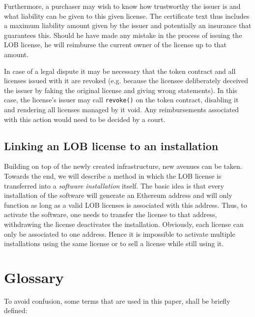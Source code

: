 \documentclass[a4paper]{article}
\begin{document}
Furthermore, a purchaser may wish to know how trustworthy the issuer is and what liability can be given to this given license. The certificate text thus includes a maximum liability amount given by the issuer and potentially an insurance that guarantees this. Should he have made any mistake in the process of issuing the LOB license, he will reimburse the current owner of the license up to that amount.

In case of a legal dispute it may be necessary that the token contract and all licenses issued with it are revoked (e.g. because the licensee deliberately deceived the issuer by faking the original license and giving wrong statements). In this case, the license's issuer may call \texttt{revoke()} on the token contract, disabling it and rendering all licenses managed by it void. Any reimbursements associated with this action would need to be decided by a court.

\subsection{Linking an LOB license to an installation}

Building on top of the newly created infrastructure, new avenues can be taken. Towards the end, we will describe a method in which the LOB license is transferred into a \emph{software installation} itself. The basic idea is that every installation of the software will generate an Ethereum address and will only function as long as a valid LOB licenses is associated with this address. Thus, to activate the software, one needs to transfer the license to that address, withdrawing the license deactivates the installation. Obviously, each license can only be associated to one address. Hence it is impossible to activate multiple installations using the same license or to sell a license while still using it.

\section{Glossary}

To avoid confusion, some terms that are used in this paper, shall be briefly defined:
\end{document}
